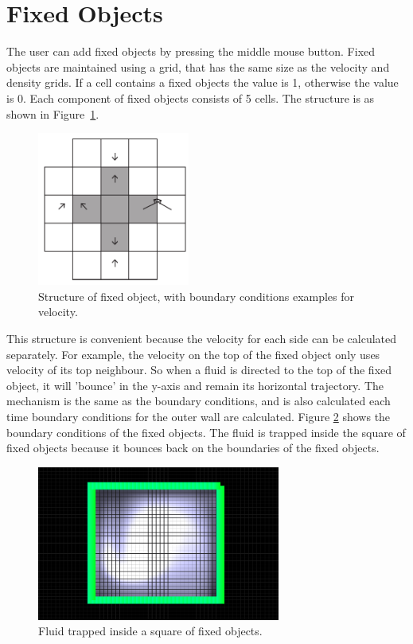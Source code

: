 \section{Fixed Objects}
The user can add fixed objects by pressing the middle mouse button. Fixed objects are maintained using a grid, that has the same size as the velocity and density grids. If a cell contains a fixed objects the value is 1, otherwise the value is 0. Each component of fixed objects consists of 5 cells. The structure is as shown in Figure~\ref{fig:fixedstructure}.

\begin{figure}[h]
    \centering
    \includegraphics[width=5cm]{img/fixedstructure.pdf}
    \caption{Structure of fixed object, with boundary conditions examples for velocity.}
    \label{fig:fixedstructure}
\end{figure}

This structure is convenient because the velocity for each side can be calculated separately. For example, the velocity on the top of the fixed object only uses velocity of its top neighbour. So when a fluid is directed to the top of the fixed object, it will 'bounce' in the y-axis and remain its horizontal trajectory. The mechanism is the same as the boundary conditions, and is also calculated each time boundary conditions for the outer wall are calculated. Figure \ref{fig:fixed} shows the boundary conditions of the fixed objects. The fluid is trapped inside the square of fixed objects because it bounces back on the boundaries of the fixed objects.

\begin{figure}[H]
    \centering
    \includegraphics[width=8cm]{img/fixed.png}
    \caption{Fluid trapped inside a square of fixed objects.}
    \label{fig:fixed}
\end{figure}
